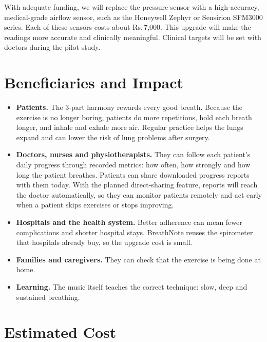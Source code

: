 \documentclass[12pt,a4paper]{article}
\newcommand{\rupee}{Rs.\,}              %
\begin{document}
With adequate funding, we will replace the pressure sensor with a high-accuracy, medical-grade airflow sensor, such as the Honeywell Zephyr or Sensirion SFM3000 series. Each of these sensors costs about \rupee 7,000. This upgrade will make the readings more accurate and clinically meaningful. Clinical targets will be set with doctors during the pilot study.

\section{Beneficiaries and Impact}

\begin{itemize}
  \item \textbf{Patients.} The 3-part harmony rewards every good breath. Because the exercise is no longer boring, patients do more repetitions, hold each breath longer, and inhale and exhale more air. Regular practice helps the lungs expand and can lower the risk of lung problems after surgery.
  \item \textbf{Doctors, nurses and physiotherapists.} They can follow each patient's daily progress through recorded metrics: how often, how strongly and how long the patient breathes. Patients can share downloaded progress reports with them today. With the planned direct-sharing feature, reports will reach the doctor automatically, so they can monitor patients remotely and act early when a patient skips exercises or stops improving.
  \item \textbf{Hospitals and the health system.} Better adherence can mean fewer complications and shorter hospital stays. BreathNote reuses the spirometer that hospitals already buy, so the upgrade cost is small.
  \item \textbf{Families and caregivers.} They can check that the exercise is being done at home.
  \item \textbf{Learning.} The music itself teaches the correct technique: slow, deep and sustained breathing.
\end{itemize}

\section{Estimated Cost}
\end{document}
